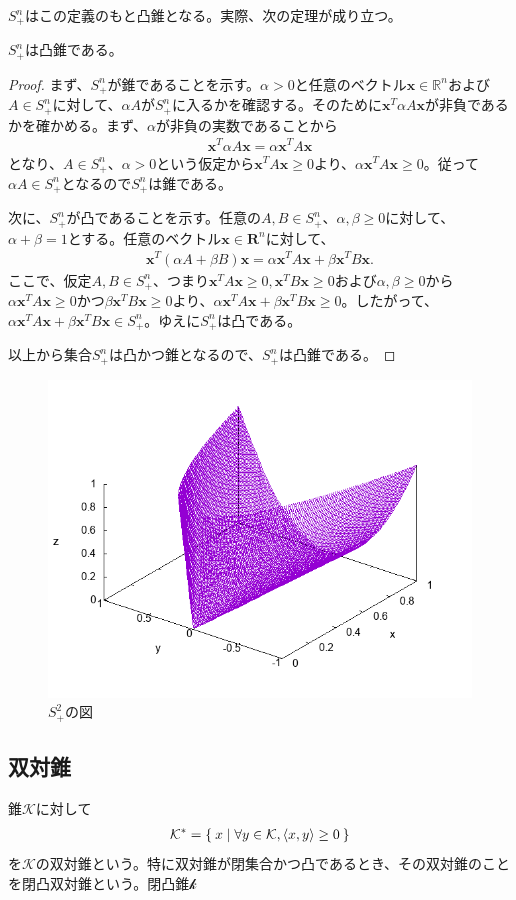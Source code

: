 $S_+^n$はこの定義のもと凸錐となる。実際、次の定理が成り立つ。
\begin{theorem}
  $S_+^n$は凸錐である。
\end{theorem}
\begin{proof}
  まず、$S_+^n$が錐であることを示す。$\alpha > 0$と任意のベクトル$\mathbf{x} \in \mathbb{R}^n$および$A \in S_+^n$に対して、$\alpha A$が$S_+^n$に入るかを確認する。そのために$\mathbf{x}^T \alpha A \mathbf{x}$が非負であるかを確かめる。まず、$\alpha$が非負の実数であることから
  \begin{align*}
    \mathbf{x}^T \alpha A \mathbf{x} = \alpha \mathbf{x}^T A \mathbf{x}
  \end{align*}
  となり、$A \in S_+^n$、$\alpha > 0$という仮定から$\mathbf{x}^T A \mathbf{x} \geq 0$より、$\alpha \mathbf{x}^T A \mathbf{x} \geq 0$。従って$\alpha A \in S_+^n$となるので$S_+^n$は錐である。

  次に、$S_+^n$が凸であることを示す。任意の$A, B \in S_+^n$、$\alpha, \beta \geq 0$に対して、$\alpha + \beta = 1$とする。任意のベクトル$\mathbf{x} \in \mathbf{R}^n$に対して、
  \begin{align*}
    \mathbf{x}^T \left(\alpha A + \beta B\right) \mathbf{x} = \alpha \mathbf{x}^T A \mathbf{x} + \beta \mathbf{x}^T B \mathbf{x}.
  \end{align*}
  ここで、仮定$A, B \in S_+^n$、つまり$\mathbf{x}^T A \mathbf{x} \geq 0, \mathbf{x}^T B \mathbf{x} \geq 0$および$\alpha, \beta \geq 0$から$\alpha \mathbf{x}^T A \mathbf{x} \geq 0$かつ$\beta \mathbf{x}^T B \mathbf{x} \geq 0$より、$\alpha \mathbf{x}^T A \mathbf{x} + \beta \mathbf{x}^T B \mathbf{x} \geq 0$。したがって、$\alpha \mathbf{x}^T A \mathbf{x} + \beta \mathbf{x}^T B \mathbf{x} \in S_+^n$。ゆえに$S_+^n$は凸である。

  以上から集合$S_+^n$は凸かつ錐となるので、$S_+^n$は凸錐である。
\end{proof}
\begin{figure}
  \includegraphics{PSDcone.png}
  \caption[]{$S_+^2$の図}
\end{figure}

\subsection{双対錐}
錐$\mathcal{K}$に対して
\begin{align*}
  \mathcal{K}^* = \Set{x | \forall y \in \mathcal{K}, \dot<x, y> \geq 0}
\end{align*}
を$\mathcal{K}$の双対錐という。特に双対錐が閉集合かつ凸であるとき、その双対錐のことを閉凸双対錐という。閉凸錐$\mathcal{k}$
